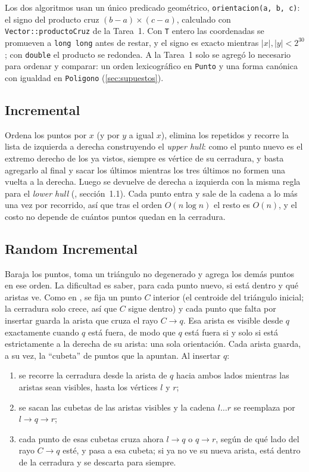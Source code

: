 \documentclass[11pt,letterpaper]{article}
\newcommand{\code}[1]{\texttt{#1}}
\begin{document}
Los dos algoritmos usan un único predicado geométrico, \code{orientacion(a, b,
c)}: el signo del producto cruz $(b-a)\times(c-a)$, calculado con
\code{Vector::productoCruz} de la Tarea~1. Con \code{T} entero las
coordenadas se promueven a \code{long long} antes de restar, y el signo es
exacto mientras $|x|,|y|<2^{30}$; con \code{double} el producto se redondea.
A la Tarea~1 solo se agregó lo necesario para ordenar y comparar: un orden
lexicográfico en \code{Punto} y una forma canónica con igualdad en
\code{Poligono} (\cref{sec:supuestos}).

\subsection{Incremental}

Ordena los puntos por $x$ (y por $y$ a igual $x$), elimina los repetidos y
recorre la lista de izquierda a derecha construyendo el \emph{upper hull}: como
el punto nuevo es el extremo derecho de los ya vistos, siempre es vértice de su
cerradura, y basta agregarlo al final y sacar los últimos mientras los tres
últimos no formen una vuelta a la derecha. Luego se devuelve de derecha a
izquierda con la misma regla para el \emph{lower hull}
(\cite{deberg}, sección~1.1). Cada punto entra y sale de la cadena a lo más una
vez por recorrido, así que tras el orden $O(n\log n)$ el resto es $O(n)$, y el
costo no depende de cuántos puntos quedan en la cerradura.

\subsection{Random Incremental}

Baraja los puntos, toma un triángulo no degenerado y agrega los demás puntos en
ese orden. La dificultad es saber, para cada punto nuevo, si está dentro y qué
aristas ve. Como en \cite{cmu}, se fija un punto $C$ interior (el centroide del
triángulo inicial; la cerradura solo crece, así que $C$ sigue dentro) y cada
punto que falta por insertar guarda la arista que cruza el rayo $C\to q$. Esa
arista es visible desde $q$ exactamente cuando $q$ está fuera, de modo que
$q$ está fuera si y solo si está estrictamente a la derecha de su arista:
una sola orientación. Cada arista guarda, a su vez, la ``cubeta'' de puntos que
la apuntan. Al insertar $q$:

\begin{enumerate}
  \item se recorre la cerradura desde la arista de $q$ hacia ambos lados
        mientras las aristas sean visibles, hasta los vértices $l$ y $r$;
  \item se sacan las cubetas de las aristas visibles y la cadena $l\ldots r$ se
        reemplaza por $l\to q\to r$;
  \item cada punto de esas cubetas cruza ahora $l\to q$ o $q\to r$, según de qué
        lado del rayo $C\to q$ esté, y pasa a esa cubeta; si ya no ve su nueva
        arista, está dentro de la cerradura y se descarta para siempre.
\end{enumerate}
\end{document}
